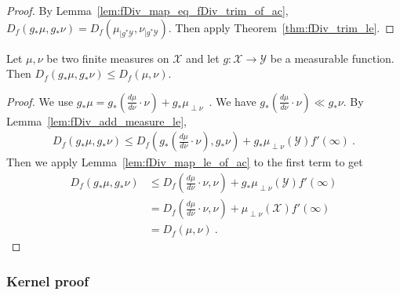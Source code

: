 \begin{proof}%
{}
By Lemma~\ref{lem:fDiv_map_eq_fDiv_trim_of_ac},  $D_f(g_* \mu, g_* \nu) = D_f(\mu_{| g^* \mathcal Y}, \nu_{| g^* \mathcal Y})$. Then apply Theorem~\ref{thm:fDiv_trim_le}.
\end{proof}


\begin{theorem}
  \label{thm:fDiv_map_le}
  Let $\mu, \nu$ be two finite measures on $\mathcal X$ and let $g : \mathcal X \to \mathcal Y$ be a measurable function. Then
  $D_f(g_* \mu, g_* \nu) \le D_f(\mu, \nu)$.
\end{theorem}

\begin{proof}%
{}
We use $g_*\mu = g_*(\frac{d\mu}{d\nu}\cdot \nu) + g_*\mu_{\perp \nu}$~. 
We have $g_*(\frac{d\mu}{d\nu}\cdot \nu) \ll g_*\nu$.
By Lemma~\ref{lem:fDiv_add_measure_le},
\begin{align*}
D_f(g_* \mu, g_* \nu)
\le D_f\left(g_*(\frac{d\mu}{d\nu}\cdot \nu), g_*\nu\right)
  + g_*\mu_{\perp \nu}(\mathcal Y) f'(\infty)
\: .
\end{align*}
Then we apply Lemma~\ref{lem:fDiv_map_le_of_ac} to the first term to get
\begin{align*}
D_f(g_* \mu, g_* \nu)
&\le D_f\left(\frac{d\mu}{d\nu}\cdot \nu, \nu\right)
  + g_*\mu_{\perp \nu}(\mathcal Y) f'(\infty)
\\
&= D_f\left(\frac{d\mu}{d\nu}\cdot \nu, \nu\right)
  + \mu_{\perp \nu}(\mathcal X) f'(\infty)
\\
&= D_f(\mu, \nu)
\: .
\end{align*}
\end{proof}


\subsubsection{Kernel proof}

